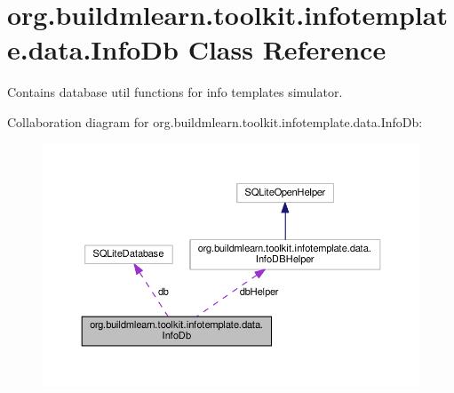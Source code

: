 \hypertarget{classorg_1_1buildmlearn_1_1toolkit_1_1infotemplate_1_1data_1_1InfoDb}{}\section{org.\+buildmlearn.\+toolkit.\+infotemplate.\+data.\+Info\+Db Class Reference}
\label{classorg_1_1buildmlearn_1_1toolkit_1_1infotemplate_1_1data_1_1InfoDb}


Contains database util functions for info template\textquotesingle{}s simulator.  




Collaboration diagram for org.\+buildmlearn.\+toolkit.\+infotemplate.\+data.\+Info\+Db\+:
\nopagebreak
\begin{figure}[H]
\begin{center}
\leavevmode
\includegraphics[width=350pt]{classorg_1_1buildmlearn_1_1toolkit_1_1infotemplate_1_1data_1_1InfoDb__coll__graph}
\end{center}
\end{figure}
